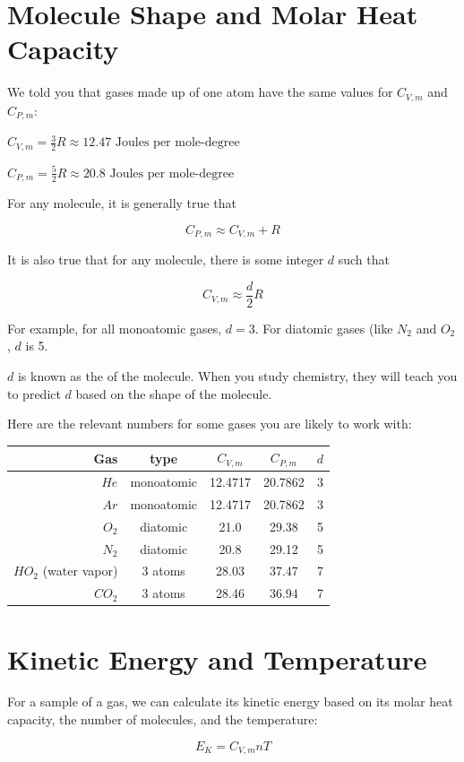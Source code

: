 \section{Molecule Shape and Molar Heat Capacity}

We told you that gases made up of one atom have the same values for $C_{V,m}$ and $C_{P,m}$:

$C_{V,m} = \frac{3}{2}R \approx 12.47 \text{ Joules per mole-degree}$

$C_{P,m} = \frac{5}{2}R \approx 20.8  \text{ Joules per mole-degree}$

For any molecule, it is generally true that 

$$C_{P,m} \approx C_{V,m} + R$$

It is also true that for any molecule,  there is some integer $d$ such that

$$C_{V, m} \approx \frac{d}{2}R$$

For example, for all monoatomic gases,  $d = 3$.  For diatomic gases (like $N_2$ and $O_2$,  $d$ is 5.

$d$ is known as the  of the molecule.  When you study chemistry, they will teach you to predict $d$ based on the shape of the molecule. 

Here are the relevant numbers for some gases you are likely to work with:

\begin{tabular}{r|c|c| c| c}
Gas & type & $C_{V,m}$ & $C_{P,m}$ & $d$\\
\hline
$He$ &  monoatomic & 12.4717 & 20.7862 & 3 \\
$Ar$ & monoatomic & 12.4717 & 20.7862 & 3 \\
$O_2$ & diatomic & 21.0 & 29.38 & 5\\
$N_2$ & diatomic & 20.8 & 29.12 & 5\\
$HO_2$ (water vapor) & 3 atoms &  28.03 & 37.47 & 7 \\
$CO_2$ & 3 atoms & 28.46 & 36.94 & 7\\
\end{tabular}

\section{Kinetic Energy and Temperature}

For a sample of a gas, we can calculate its kinetic energy based on its molar heat capacity,  the number of molecules, and the temperature:

$$E_K = C_{V,m} n T$$

